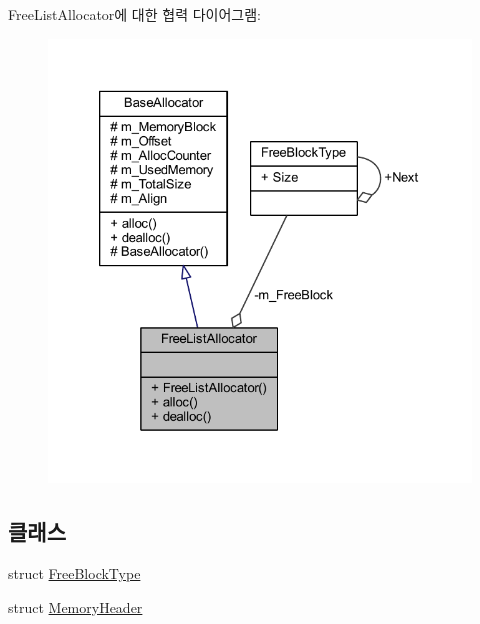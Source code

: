 Free\+List\+Allocator에 대한 협력 다이어그램\+:\nopagebreak
\begin{figure}[H]
\begin{center}
\leavevmode
\includegraphics[width=326pt]{class_comet_engine_1_1_core_1_1_memory_1_1_free_list_allocator__coll__graph}
\end{center}
\end{figure}
\subsection*{클래스}
\begin{DoxyCompactItemize}
\item 
struct \hyperlink{struct_comet_engine_1_1_core_1_1_memory_1_1_free_list_allocator_1_1_free_block_type}{Free\+Block\+Type}
\item 
struct \hyperlink{struct_comet_engine_1_1_core_1_1_memory_1_1_free_list_allocator_1_1_memory_header}{Memory\+Header}
\end{DoxyCompactItemize}
